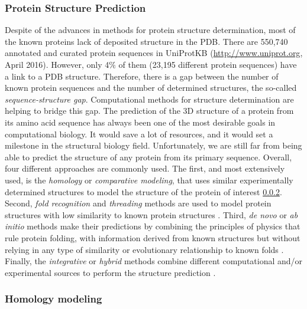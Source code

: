 \documentclass[12pt, b5paper,twoside]{tesi_upf}
\begin{document}
\pagebreak

\subsubsection{Protein Structure Prediction} \label{structure_predicion}


\par Despite of the advances in methods for protein structure determination, most of the known proteins lack of deposited structure in the PDB. There are 550,740 annotated and curated protein sequences in UniProtKB (\url{http://www.uniprot.org}, April 2016). However, only 4$\%$ of them (23,195 different protein sequences) have a link to a PDB structure. Therefore, there is a gap between the number of known protein sequences and the number of determined structures, the so-called \textit{sequence-structure gap}. Computational methods for structure determination are helping to bridge this gap. The prediction of the 3D structure of a protein from its amino acid sequence has always been one of the most desirable goals in computational biology. It would save a lot of resources, and it would set a milestone in the structural biology field. Unfortunately, we are still far from being able to predict the structure of any protein from its primary sequence. Overall, four different approaches are commonly used. The first, and most extensively used, is the \textit{homology} or \textit{comparative modeling}, that uses similar experimentally determined structures to model the structure of the protein of interest \ref{Homology_modeling}. Second, \textit{fold recognition} and \textit{threading} methods are used to model protein structures with low similarity to known protein structures \cite{Jones1992, Bowie1991}. Third, \textit{de novo} or \textit{ab initio} methods make their predictions by combining the principles of physics that rule protein folding, with information derived from known structures but without relying in any type of similarity or evolutionary relationship to known folds \cite{Lee2009}. Finally, the \textit{integrative} or \textit{hybrid} methods combine different computational and/or experimental sources to perform the structure prediction \cite{Russel2012}.   
 
\subsubsection{Homology modeling} \label{Homology_modeling}
\end{document}
